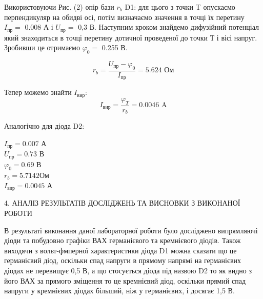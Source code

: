\documentclass[a4paper,14pt]{extreport}
\begin{document}
Використовуючи Рис. (2)  опір бази $r_b$ D1: для цього з точки T опускаємо перпендикуляр на обидві осі, потім визначаємо значення в точці їх перетину $I_{\text{пр}} = $ 0.008 А і $U_{\text{пр}} = $ 0,3 В. Наступним кроком знайдемо дифузійний потенціал який знаходиться в точці перетину дотичної проведеної до точки Т і вісі напруг. Зробивши це отримаємо $\varphi_0 = $ 0.255 В.

\begin{equation}
r_b = \dfrac{U_{\text{пр}} - \varphi_0}{I_{\text{пр}}} = 5.624 \text{ Ом}
\label{eq:ref}
\end{equation}

Тепер можемо знайти $I_{\text{вир}}$:
\begin{equation}
I_{\text{вир}} = \dfrac{\varphi_T}{r_b} = 0.0046 \text{ A}
\label{eq:ref}
\end{equation}

Аналогічно для діода D2:
\begin{center}
$I_{\text{пр}} = 0.007$ А\\
\vspace{0.3cm}
$U_{\text{пр}} = 0.73$ В\\
\vspace{0.3cm}
$\varphi_0 = 0.69$ В\\
\vspace{0.3cm}
$r_b =  5.7142 $Ом\\
\vspace{0.3cm}
$I_{\text{вир}} =0.0045$ А\\
\vspace{0.3cm}
\label{eq:ref}
\end{center}


\clearpage
\newpage
\begin{center}4. АНАЛІЗ РЕЗУЛЬТАТІВ ДОСЛІДЖЕНЬ ТА ВИСНОВКИ З ВИКОНАНОЇ РОБОТИ\\ \end{center}

В результаті виконання даної лабораторної роботи було досліджено випрямляючі діоди та побудовно графіки ВАХ германієвого та кремнієвого діодів. Також виходячи з вольт-фмперної характеристики діода D1 можна сказати що це германієвий діод, оскільки спад напруги в прямому напрямі на германієвих діодах не перевищує 0,5 В, а що стосується діода під назвою D2 то як видно з його ВАХ за прямого зміщення то це кремнієвий діод, оскільки прямий спад напруги у кремнієвих діодах більший, ніж у германієвих, і досягає 1,5 В.
\end{document}
